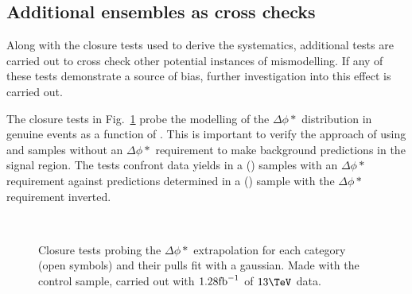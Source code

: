 \subsection{Additional ensembles as cross checks}
\label{sec:closureCrossCheck}

Along with the closure tests used to derive the systematics,
additional tests are carried out to cross check other potential
instances of mismodelling. If any of these tests demonstrate a source
of bias, further investigation into this effect is carried out. 

The closure tests in Fig.~\ref{fig:closureBDPhi} probe the modelling
of the $\Delta\phi *$ distribution in genuine \met events as a
function of \scalht. This is important to verify the approach of using
\mj and \mmj samples without an $\Delta\phi *$ requirement to make
background predictions in the signal region. The tests confront data
yields in a \mj (\mmj) samples with an $\Delta\phi *$ requirement
against predictions determined in a \mj (\mmj) sample with the
$\Delta\phi *$ requirement inverted. 

\begin{figure}[h!]
  \begin{center}
    ~~
    \caption{Closure tests probing the $\Delta\phi *$ extrapolation for each
    \njet category (open symbols) and their pulls fit with a gaussian.
    Made with the \mj control sample, carried out with $1.28\text{fb}^{-1}$ of
      $13\tev$ data. }
    \label{fig:closureBDPhi}
  \end{center} 
\end{figure}

